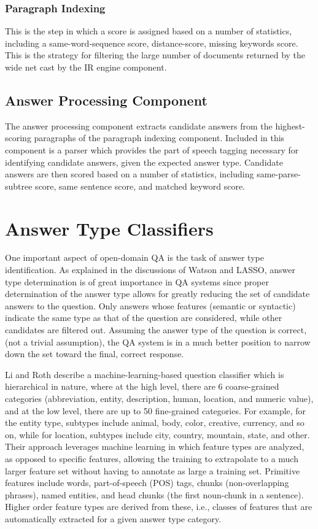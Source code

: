 \subsubsection{Paragraph Indexing}

This is the step in which a score is assigned based on a number of statistics, including a same-word-sequence score, distance-score, missing keywords score.  This is the strategy for filtering the large number of documents returned by the wide net cast by the IR engine component.

\subsection{Answer Processing Component}

The answer processing component extracts candidate answers from the highest-scoring paragraphs of the paragraph indexing component.  Included in this component is a parser which provides the part of speech tagging necessary for identifying candidate answers, given the expected answer type.  Candidate answers are then scored based on a number of statistics, including same-parse-subtree score, same sentence score, and matched keyword score.


\section{Answer Type Classifiers}

One important aspect of open-domain QA is the task of answer type identification.  As explained in the discussions of Watson and LASSO, answer type determination is of great importance in QA systems since proper determination of the answer type allows for greatly reducing the set of candidate answers to the question.  Only answers whose features (semantic or syntactic) indicate the same type as that of the question are considered, while other candidates are filtered out.  Assuming the answer type of the question is correct, (not a trivial assumption), the QA system is in a much better position to narrow down the set toward the final, correct response.

Li and Roth \cite{li2002learning} describe a machine-learning-based question classifier which is hierarchical in nature, where at the high level, there are 6 coarse-grained categories (abbreviation, entity, description, human, location, and numeric value), and at the low level, there are up to 50 fine-grained categories.  For example, for the entity type, subtypes include animal, body, color, creative, currency, and so on, while for location, subtypes include city, country, mountain, state, and other.  Their approach leverages machine learning in which feature types are analyzed, as opposed to specific features, allowing the training to extrapolate to a much larger feature set without having to annotate as large a training set.  Primitive features include words, part-of-speech (POS) tags, chunks (non-overlapping phrases), named entities, and head chunks (the first noun-chunk in a sentence).   Higher order feature types are derived from these, i.e., classes of features that are automatically extracted for a given answer type category. 

